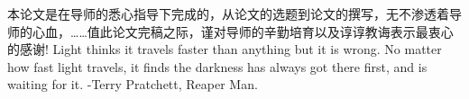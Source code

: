 
\begin{thanks}

本论文是在导师的悉心指导下完成的，从论文的选题到论文的撰写，无不渗透着导师的心血，……值此论文完稿之际，谨对导师的辛勤培育以及谆谆教诲表示最衷心的感谢!
Light thinks it travels faster than anything but it is wrong. No matter how fast light travels, it finds the darkness has always got there first, and is waiting for it. -Terry Pratchett, Reaper Man.
\end{thanks}
